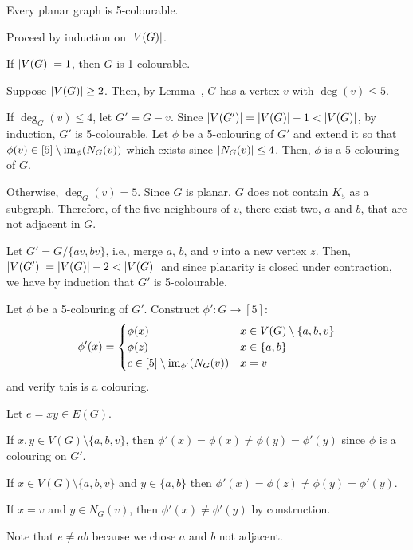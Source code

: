 \begin{theorem}
  Every planar graph is 5-colourable.
\end{theorem}
\begin{prf}
  Proceed by induction on $\abs{V(G)}$.

  If $\abs{V(G)} = 1$, then $G$ is 1-colourable.

  Suppose $\abs{V(G)} \geq 2$. Then, by Lemma~,
  $G$ has a vertex $v$ with $\deg(v) \leq 5$.

  If $\deg_G(v) \leq 4$, let $G' = G-v$.
  Since $\abs{V(G')} = \abs{V(G)} - 1 < \abs{V(G)}$,
  by induction, $G'$ is 5-colourable.
  Let $\phi$ be a 5-colouring of $G'$
  and extend it so that $\phi(v) \in [5] \setminus \operatorname{im}_\phi(N_G(v))$
  which exists since $\abs{N_G(v)} \leq 4$.
  Then, $\phi$ is a 5-colouring of $G$.

  Otherwise, $\deg_G(v) = 5$.
  Since $G$ is planar, $G$ does not contain $K_5$ as a subgraph.
  Therefore, of the five neighbours of $v$,
  there exist two, $a$ and $b$, that are not adjacent in $G$.

  Let $G' = G / \{av,bv\}$, i.e., merge $a$, $b$, and $v$ into a new vertex $z$.
  Then, $\abs{V(G')} = \abs{V(G)} - 2 < \abs{V(G)}$
  and since planarity is closed under contraction,
  we have by induction that $G'$ is 5-colourable.

  Let $\phi$ be a 5-colouring of $G'$.
  Construct $\phi' : G \to [5]$:
  \[
    \phi'(x) = \begin{cases}
      \phi(x)                                 & x \in V(G) \setminus \{a,b,v\} \\
      \phi(z)                                 & x \in \{a,b\}                  \\
      c \in [5] \setminus \operatorname{im}_{\phi'}(N_G(v)) & x = v
    \end{cases}
  \]
  and verify this is a colouring.

  Let $e = xy \in E(G)$.

  If $x,y \in V(G) \setminus \{a,b,v\}$,
  then $\phi'(x) = \phi(x) \neq \phi(y) = \phi'(y)$
  since $\phi$ is a colouring on $G'$.

  If $x \in V(G) \setminus\{a,b,v\}$ and $y \in \{a,b\}$
  then $\phi'(x) = \phi(z) \neq \phi(y) = \phi'(y)$.

  If $x = v$ and $y \in N_G(v)$, then $\phi'(x) \neq \phi'(y)$ by construction.

  Note that $e \neq ab$ because we chose $a$ and $b$ not adjacent.
\end{prf}

